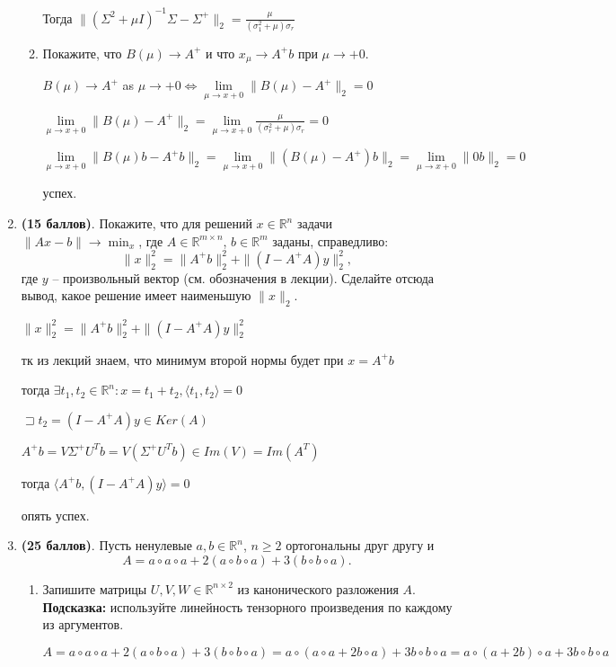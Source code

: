 \documentclass[a4paper, 11pt]{article}
\newcommand{\RR}{\mathbb{R}}
\newcommand{\prob}[1]{\item \textbf{(#1 баллов)}.}
\begin{document}
\begin{enumerate}
\begin{enumerate}
			Тогда $\|(\Sigma^2 + \mu I)^{-1} \Sigma - \Sigma^+\|_2 = \frac{\mu}{(\sigma_1^2 + \mu) \sigma_r}$
		
		\item Покажите, что $B(\mu)\to A^+$ и что $x_\mu\to A^+b$ при $\mu\to +0$.
		
			$B(\mu) \to A^+$ as $\mu \to +0 \Longleftrightarrow \lim\limits_{\mu \to x +0} \|B(\mu) - A^+\|_2 = 0$
			
			$\lim\limits_{\mu \to x +0} \|B(\mu) - A^+\|_2 = \lim\limits_{\mu \to x +0} \frac{\mu}{(\sigma_r^2 + \mu) \sigma_r} = 0$
			
			$\lim\limits_{\mu \to x +0} \|B(\mu)b - A^+b\|_2 = \lim\limits_{\mu \to x +0} \|(B(\mu) - A^+)b\|_2 = \lim\limits_{\mu \to x +0} \|0 b\|_2 = 0$
			
			успех.
		
	\end{enumerate}
	\prob{15} Покажите, что для решений $x\in\mathbb{R}^n$ задачи $\|Ax - b\| \to \min_x$, где $A\in\mathbb{R}^{m\times n}$, $b\in\mathbb{R}^{m}$ заданы, справедливо:
	\[
	\|x\|_2^2 = \|A^+b\|_2^2 + \|(I - A^+ A)y\|_2^2, 
	\]
	где $y$ -- произвольный вектор (см. обозначения в лекции). Сделайте отсюда вывод, какое решение имеет наименьшую $\|x\|_2$. 
	
		$\|x\|_2^2 = \|A^+ b\|_2^2 + \|(I - A^+A)y\|_2^2$
		
		тк из лекций знаем, что минимум второй нормы будет при $x = A^+b$
		
		тогда $\exists t_1, t_2 \in \RR^n :  x = t_1 + t_2, \langle t_1, t_2 \rangle = 0$
		
		$\sqsupset t_2 = (I - A^+A)y \in Ker(A)$
		
		$A^+b = V \Sigma^+ U^T b = V (\Sigma^+ U^T 	b) \in Im(V) = Im(A^T)$
		
		тогда $\langle A^+b, (I - A^+A)y \rangle = 0$
		
		опять успех.
	
	\prob{25}
	Пусть ненулевые $a, b\in\mathbb{R}^{n}$, $n\geq 2$ ортогональны друг другу и 
	\[
	A = a \circ a \circ a + 2 (a \circ b \circ a) + 3 (b \circ b \circ a).
	\]
	\begin{enumerate}
		\item Запишите матрицы $U,V,W \in\mathbb{R}^{n\times 2}$ из канонического разложения $A$. 
		\\ \textbf{Подсказка:} используйте линейность тензорного произведения по каждому из  аргументов.
		
			$A = a \circ a \circ a + 2 (a \circ b \circ a) + 3 (b \circ b \circ a) = a \circ (a \circ a + 2b \circ a) + 3b \circ b \circ a = a \circ (a + 2b) \circ a + 3b \circ b \circ a$
			

\end{enumerate}
\end{enumerate}
\end{document}
